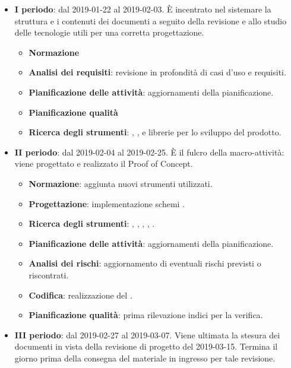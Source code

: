		\begin{itemize}
			\item \textbf{I periodo}: dal 2019-01-22 al 2019-02-03. È incentrato nel sistemare la struttura e i contenuti
			dei documenti a seguito della revisione e allo studio delle tecnologie utili per una corretta progettazione.
			\begin{itemize}
    	        \item \textbf{Normazione}
    	        \item \textbf{Analisi dei requisiti}: revisione in profondità di casi d'uso e requisiti.
    	        \item \textbf{Pianificazione delle attività}: aggiornamenti della pianificazione.
    	        \item \textbf{Pianificazione qualità}
    	        \item \textbf{Ricerca degli strumenti}: , ,  e librerie per lo sviluppo del prodotto.
        	\end{itemize}
			\item \textbf{II periodo}: dal 2019-02-04 al 2019-02-25. È il fulcro della macro-attività: viene progettato e realizzato
				il Proof of Concept. 
			\begin{itemize}
				\item \textbf{Normazione}: aggiunta nuovi strumenti utilizzati.
				\item \textbf{Progettazione}: implementazione schemi .
				\item \textbf{Ricerca degli strumenti}: , , ,
				, .
    	        \item \textbf{Pianificazione delle attività}: aggiornamenti della pianificazione.
    	        \item \textbf{Analisi dei rischi}: aggiornamento di eventuali rischi previsti o riscontrati.
    	        \item \textbf{Codifica}: realizzazione del .
    	        \item \textbf{Pianificazione qualità}: prima rilevazione indici per la verifica.
        	\end{itemize}
        	\item \textbf{III periodo}: dal 2019-02-27 al 2019-03-07. Viene ultimata la stesura dei documenti
				in vista della revisione di progetto del 2019-03-15. Termina il giorno prima della consegna del
				materiale in ingresso per tale revisione.

\end{itemize}
